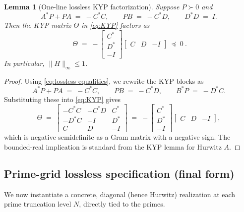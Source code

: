 \documentclass[11pt]{article}
\newtheorem{lemma}[theorem]{Lemma}
\theoremstyle{remark}
\begin{document}
\begin{lemma}[One-line lossless KYP factorization]\label{lem:losslessKYP}
Suppose \(P\succ 0\) and
\begin{equation}\label{eq:lossless-equalities}
 A^*P+PA\;=\;-C^*C,\qquad PB\;=\;-C^*D,\qquad D^*D\;=\;I.
\end{equation}
Then the KYP matrix \(\Theta\) in \eqref{eq:KYP} factors as
\begin{equation}\label{eq:one-line-factor}
 \boxed{\ \Theta\;=\;-\begin{bmatrix}C^*\\ D^*\\ -I\end{bmatrix}\!\begin{bmatrix}C & D & -I\end{bmatrix}\ \preceq\ 0\ }.
\end{equation}
In particular, \(\|H\|_\infty\le 1\).
\end{lemma}
\begin{proof}
Using \eqref{eq:lossless-equalities}, we rewrite the KYP blocks as
\[
 A^*P+PA\;=\;-C^*C,\qquad PB\;=\;-C^*D,\qquad B^*P\;=\;-D^*C.
\]
Substituting these into \eqref{eq:KYP} gives
\[
 \Theta\;=\;\begin{bmatrix}
  -C^*C & -C^*D & C^*\\
  -D^*C & -I & D^*\\
  C & D & -I
 \end{bmatrix}\;=\;-\begin{bmatrix}C^*\\ D^*\\ -I\end{bmatrix}\!\begin{bmatrix}C & D & -I\end{bmatrix},
\]
which is negative semidefinite as a Gram matrix with a negative sign. The bounded-real implication is standard from the KYP lemma for Hurwitz \(A\).
\end{proof}

\subsection{Prime-grid lossless specification (final form)}
We now instantiate a concrete, diagonal (hence Hurwitz) realization at each prime truncation level \(N\), directly tied to the primes.
\end{document}
